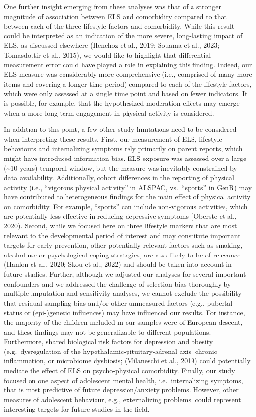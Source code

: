 \documentclass[
  letterpaper,
  DIV=11,
  numbers=noendperiod]{scrreport}
\begin{document}
One further insight emerging from these analyses was that of a stronger
magnitude of association between ELS and comorbidity compared to that
between each of the three lifestyle factors and comorbidity. While this
result could be interpreted as an indication of the more severe,
long-lasting impact of ELS, as discussed elsewhere (Henchoz et al.,
2019; Souama et al., 2023; Tomasdottir et al., 2015), we would like to
highlight that differential measurement error could have played a role
in explaining this finding. Indeed, our ELS measure was considerably
more comprehensive (i.e., comprised of many more items and covering a
longer time period) compared to each of the lifestyle factors, which
were only assessed at a single time point and based on fewer indicators.
It is possible, for example, that the hypothesized moderation effects
may emerge when a more long-term engagement in physical activity is
considered.

In addition to this point, a few other study limitations need to be
considered when interpreting these results. First, our measurement of
ELS, lifestyle behaviours and internalizing symptoms rely primarily on
parent reports, which might have introduced information bias. ELS
exposure was assessed over a large (\textasciitilde10 years) temporal
window, but the measure was inevitably constrained by data availability.
Additionally, cohort differences in the reporting of physical activity
(i.e., ``vigorous physical activity'' in ALSPAC, vs.~``sports'' in GenR)
may have contributed to heterogeneous findings for the main effect of
physical activity on comorbidity. For example, ``sports'' can include
non-vigorous activities, which are potentially less effective in
reducing depressive symptoms (Oberste et al., 2020). Second, while we
focused here on three lifestyle markers that are most relevant to the
developmental period of interest and may constitute important targets
for early prevention, other potentially relevant factors such as
smoking, alcohol use or psychological coping strategies, are also likely
to be of relevance (Hanlon et al., 2020; Skou et al., 2022) and should
be taken into account in future studies. Further, although we adjusted
our analyses for several important confounders and we addressed the
challenge of selection bias thoroughly by multiple imputation and
sensitivity analyses, we cannot exclude the possibility that residual
sampling bias and/or other unmeasured factors (e.g., pubertal status or
(epi-)genetic influences) may have influenced our results. For instance,
the majority of the children included in our samples were of European
descent, and these findings may not be generalizable to different
populations. Furthermore, shared biological risk factors for depression
and obesity (e.g.~dysregulation of the hypothalamic-pituitary-adrenal
axis, chronic inflammation, or microbiome dysbiosis; (Milaneschi et al.,
2019) could potentially mediate the effect of ELS on psycho-physical
comorbidity. Finally, our study focused on one aspect of adolescent
mental health, i.e.~internalizing symptoms, that is most predictive of
future depression/anxiety problems. However, other measures of
adolescent behaviour, e.g., externalizing problems, could represent
interesting targets for future studies in the field.
\end{document}

